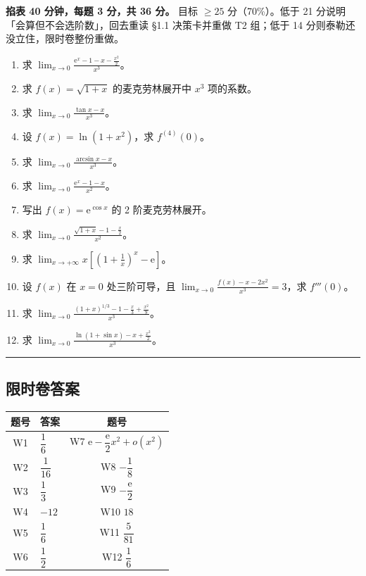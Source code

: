 \documentclass[11pt,a4paper]{ctexart}
\newcommand{\ee}{\mathrm{e}}
\begin{document}
\begin{keypoint}[用法与验收线]
\textbf{掐表 40 分钟，每题 3 分，共 36 分。} 目标 $\ge25$ 分（70\%）。低于 21 分说明「会算但不会选阶数」，回去重读 §1.1 决策卡并重做 T2 组；低于 14 分则泰勒还没立住，限时卷整份重做。
\end{keypoint}

\begin{enumerate}[label=\textbf{W\arabic*.}]
  \item 求 $\displaystyle\lim_{x\to0}\frac{\ee^{x}-1-x-\frac{x^{2}}{2}}{x^{3}}$。
  \item 求 $f(x)=\sqrt{1+x}$ 的麦克劳林展开中 $x^{3}$ 项的系数。
  \item 求 $\displaystyle\lim_{x\to0}\frac{\tan x-x}{x^{3}}$。
  \item 设 $f(x)=\ln(1+x^{2})$，求 $f^{(4)}(0)$。
  \item 求 $\displaystyle\lim_{x\to0}\frac{\arcsin x-x}{x^{3}}$。
  \item 求 $\displaystyle\lim_{x\to0}\frac{\ee^{x}-1-x}{x^{2}}$。
  \item 写出 $f(x)=\ee^{\cos x}$ 的 2 阶麦克劳林展开。
  \item 求 $\displaystyle\lim_{x\to0}\frac{\sqrt{1+x}-1-\frac{x}{2}}{x^{2}}$。
  \item 求 $\displaystyle\lim_{x\to+\infty}x\left[\left(1+\frac1x\right)^{x}-\ee\right]$。
  \item 设 $f(x)$ 在 $x=0$ 处三阶可导，且 $\displaystyle\lim_{x\to0}\frac{f(x)-x-2x^{2}}{x^{3}}=3$，求 $f'''(0)$。
  \item 求 $\displaystyle\lim_{x\to0}\frac{(1+x)^{1/3}-1-\frac{x}{3}+\frac{x^{2}}{9}}{x^{3}}$。
  \item 求 $\displaystyle\lim_{x\to0}\frac{\ln(1+\sin x)-x+\frac{x^{2}}{2}}{x^{3}}$。
\end{enumerate}

\vspace{2em}
\noindent\rule{\textwidth}{0.4pt}

\subsection{限时卷答案}

\begin{center}
\small\setlength{\tabcolsep}{5pt}
\begin{tabularx}{\linewidth}{c|l c}
\toprule
题号 & 答案 & 题号\\
\midrule
W1 & $\dfrac16$ & W7 $\ee-\dfrac{\ee}{2}x^{2}+o(x^{2})$\\
W2 & $\dfrac1{16}$ & W8 $-\dfrac18$\\
W3 & $\dfrac13$ & W9 $-\dfrac{\ee}{2}$\\
W4 & $-12$ & W10 $18$\\
W5 & $\dfrac16$ & W11 $\dfrac5{81}$\\
W6 & $\dfrac12$ & W12 $\dfrac16$\\
\bottomrule
\end{tabularx}
\end{center}
\end{document}
